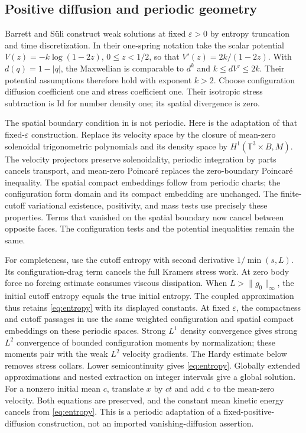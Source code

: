 \documentclass[11pt]{article}
\numberwithin{equation}{section}
\newcommand{\T}{\mathbb T^3}
\newcommand{\Id}{\mathrm{Id}}
\begin{document}
\subsection{Positive diffusion and periodic geometry}\label{subsec:existence}
Barrett and S\"uli \cite[Theorem~6.1]{BS} construct weak solutions at fixed
$\varepsilon>0$ by entropy truncation and time discretization. In their
one-spring notation take the scalar potential
$V(z)=-k\log(1-2z)$, $0\leq z<1/2$, so that
$V'(z)=2k/(1-2z)$. With $d(q)=1-|q|$, the Maxwellian is comparable to $d^k$ and
$k\leq dV'\leq2k$. Their potential assumptions therefore hold with exponent
$k>2$. Choose configuration diffusion coefficient one and stress coefficient
one. Their isotropic stress subtraction is $\Id$ for number density one; its
spatial divergence is zero.

The spatial boundary condition in \cite{BS} is not periodic. Here is the
adaptation of that fixed-$\varepsilon$ construction. Replace its velocity
space by the closure of mean-zero solenoidal trigonometric polynomials and its
density space by $H^1(\T\times B,M)$. The velocity projectors preserve
solenoidality, periodic integration by parts cancels transport, and mean-zero
Poincar\'e replaces the zero-boundary Poincar\'e inequality. The spatial compact
embeddings follow from periodic charts; the configuration form domain and its
compact embedding are unchanged. The finite-cutoff variational existence,
positivity, and mass tests use precisely these properties. Terms that vanished
on the spatial boundary now cancel between opposite faces. The configuration
tests and the potential inequalities remain the same.

For completeness, use the cutoff entropy with second derivative
$1/\min(s,L)$. Its configuration-drag term cancels the full Kramers stress
work. At zero body force no forcing estimate consumes viscous dissipation.
When $L>\|g_0\|_\infty$, the initial cutoff entropy equals the true initial
entropy. The coupled approximation thus retains \eqref{eq:entropy} with its
displayed constants. At fixed $\varepsilon$, the compactness and cutoff
passages in \cite{BS} use the same weighted configuration and spatial compact
embeddings on these periodic spaces. Strong $L^1$ density convergence gives
strong $L^2$ convergence of bounded configuration moments by normalization;
these moments pair with the weak $L^2$ velocity gradients. The Hardy estimate
below removes stress collars. Lower semicontinuity gives \eqref{eq:entropy}.
Globally extended approximations and nested extraction on integer intervals
give a global solution. For a nonzero initial mean $c$, translate $x$ by $ct$
and add $c$ to the mean-zero velocity. Both equations are preserved, and the
constant mean kinetic energy cancels from \eqref{eq:entropy}. This is a
periodic adaptation of a fixed-positive-diffusion construction, not an imported
vanishing-diffusion assertion.
\end{document}
